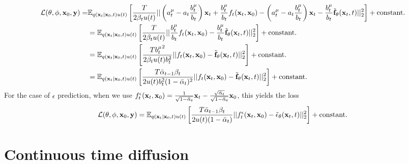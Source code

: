 \begin{align}
    {\mathcal{L}}(\theta, \phi, {\mathbf{x}}_0, {\mathbf{y}}) =& \mathbb{E}_{q({\mathbf{x}}_t|{\mathbf{x}}_0,t)u(t)} \left[ \frac{T}{2 \beta_t u(t)} || \left( a_t^\mu - a_t \frac{b_t^\mu}{b_t} \right) {\mathbf{x}}_t + \frac{b_t^\mu}{b_t} f_t({\mathbf{x}}_t, {\mathbf{x}}_0) - \left( a_t^\mu - a_t \frac{b_t^\mu}{b_t} \right) {\mathbf{x}}_t - \frac{b_t^\mu}{b_t} \tilde{\mathbf{f}}_\theta({\mathbf{x}}_t, t) ||_2^2 \right] + \text{constant}. \\
    &= \mathbb{E}_{q({\mathbf{x}}_t|{\mathbf{x}}_0,t)u(t)} \left[ \frac{T}{2 \beta_t u(t)} || \frac{b_t^\mu}{b_t} f_t({\mathbf{x}}_t, {\mathbf{x}}_0) - \frac{b_t^\mu}{b_t} \tilde{\mathbf{f}}_\theta({\mathbf{x}}_t, t) ||_2^2 \right] + \text{constant}. \\
    &= \mathbb{E}_{q({\mathbf{x}}_t|{\mathbf{x}}_0,t)u(t)} \left[ \frac{T {b_t^\mu}^2 }{2 \beta_t u(t) b_t^2 } || f_t({\mathbf{x}}_t, {\mathbf{x}}_0) - \tilde{\mathbf{f}}_\theta({\mathbf{x}}_t, t) ||_2^2 \right] + \text{constant}. \\
    &= \mathbb{E}_{q({\mathbf{x}}_t|{\mathbf{x}}_0,t)u(t)} \left[ \frac{T \bar{\alpha}_{t-1} \beta_t }{2 u(t) b_t^2 (1-\bar{\alpha}_t)^2 } || f_t({\mathbf{x}}_t, {\mathbf{x}}_0) - \tilde{\mathbf{f}}_\theta({\mathbf{x}}_t, t) ||_2^2 \right] + \text{constant}.
\end{align}
For the case of $\epsilon$ prediction, when we use $f_t^\epsilon({\mathbf{x}}_t, {\mathbf{x}}_0) = \frac{1}{\sqrt{1-\bar{\alpha}_t}} {\mathbf{x}}_t - \frac{\sqrt{\bar{\alpha}_t}}{\sqrt{1-\bar{\alpha}_t}} {\mathbf{x}}_0$, this yields the loss
\begin{equation}
    {\mathcal{L}}(\theta, \phi, {\mathbf{x}}_0, {\mathbf{y}}) = \mathbb{E}_{q({\mathbf{x}}_t|{\mathbf{x}}_0,t)u(t)} \left[ \frac{T \bar{\alpha}_{t-1} \beta_t }{2 u(t) (1-\bar{\alpha}_t) } || f_t^\epsilon({\mathbf{x}}_t, {\mathbf{x}}_0) - \tilde{\mathbf{\epsilon}}_\theta({\mathbf{x}}_t, t) ||_2^2 \right] + \text{constant}.
\end{equation}


\section{Continuous time diffusion}

\newpage
\newpage

